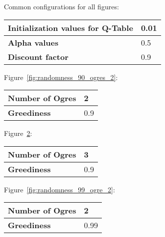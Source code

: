 \documentclass[a4paper,10pt]{scrartcl}
\begin{document}
\begin{figure}[htp]
\centering
\caption{}\label{fig:randomness_99_ogres_2}
\end{figure}


\begin{figure}[htp]
\centering
\caption{}\label{fig:randomness_90_ogres_3}
\end{figure}

\begin{figure}[htp]
\centering
\caption{}\label{fig:randomness_99_3}
\end{figure}


Common configurations for all figures: 
\begin{center}
\begin{tabular}{|l|l|}
\hline
\textbf{Initialization values for Q-Table} & 0.01 \\
\hline
\textbf{Alpha values} & 0.5 \\
\hline
\textbf{Discount factor} & 0.9 \\
\hline
\end{tabular}
\end{center}

Figure~\ref{fig:randomness_90_ogres_2}:
\begin{center}
\begin{tabular}{|l|l|}
\hline
\textbf{Number of Ogres} & 2 \\
\hline
\textbf{Greediness} & 0.9 \\
\hline
\end{tabular}
\end{center}

Figure~\ref{fig:randomness_90_ogres_3}:
\begin{center}
\begin{tabular}{|l|l|}
\hline
\textbf{Number of Ogres} & 3 \\
\hline
\textbf{Greediness} & 0.9 \\
\hline
\end{tabular}
\end{center}

Figure~\ref{fig:randomness_99_ogre_2}:
\begin{center}
\begin{tabular}{|l|l|}
\hline
\textbf{Number of Ogres} & 2 \\
\hline
\textbf{Greediness} & 0.99 \\
\hline
\hline
\end{tabular}
\end{center}
\end{document}
